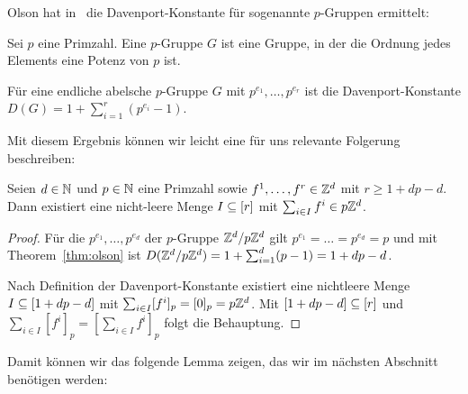 Olson hat in~\cite{Olson1969} die Davenport-Konstante für sogenannte $p$-Gruppen ermittelt:
\begin{definition}[$p$-Gruppe]
	Sei $p$ eine Primzahl.
	Eine $p$-Gruppe $G$ ist eine Gruppe, in der die Ordnung jedes Elements eine Potenz von $p$ ist.
\end{definition}

\begin{theorem}[Olson]\label{thm:olson}
	Für eine endliche abelsche $p$-Gruppe $G$ mit  $p^{e_1},\dots,p^{e_r}$ ist die Davenport-Konstante $D(G)=1+\sum_{i=1}^r(p^{e_i}-1)$.
\end{theorem}

Mit diesem Ergebnis können wir leicht eine für uns relevante Folgerung beschreiben:

\begin{corollary}\label{cor:olson}
	Seien $d\in\mathbb{N}$ und $p\in\mathbb{N}$ eine Primzahl sowie $f^1,\dots,f^r\in\mathbb{Z}^d$ mit $r\geq 1+dp-d$.
	Dann existiert eine nicht-leere Menge $I\subseteq[r]$ mit $\sum_{i\in I}f^i\in p\mathbb{Z}^d$.
\end{corollary}
\begin{proof}
	Für die  $p^{e_1},\dots,p^{e_d}$ der $p$-Gruppe $\mathbb{Z}^d/p\mathbb{Z}^d$ gilt $p^{e_1}=\dots=p^{e_d}=p$ und mit Theorem~\ref{thm:olson} ist $D(\mathbb{Z}^d/p\mathbb{Z}^d)=1+\sum_{i=1}^d(p-1)=1+dp-d$.
	
	Nach Definition der Davenport-Konstante existiert eine nichtleere Menge $I\subseteq[1+dp-d]$ mit $\sum_{i\in I}[f^i]_p=[0]_p=p\mathbb{Z}^d$.
	Mit $[1+dp-d]\subseteq[r]$ und $\sum_{i\in I}[f^i]_p=[\sum_{i\in I}f^i]_p$ folgt die Behauptung.
\end{proof}

Damit können wir das folgende Lemma zeigen, das wir im nächsten Abschnitt benötigen werden:

